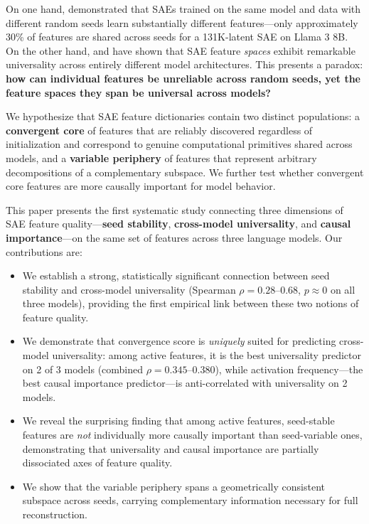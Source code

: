 \documentclass[final]{article}
\begin{document}
On one hand, \citet{paulo2025sparse} demonstrated that SAEs trained on the same model and data with different random seeds learn substantially different features---only approximately 30\% of features are shared across seeds for a 131K-latent SAE on Llama 3 8B. On the other hand, \citet{lan2024universal} and \citet{thasarathan2025universal} have shown that SAE feature \emph{spaces} exhibit remarkable universality across entirely different model architectures. This presents a paradox: \textbf{how can individual features be unreliable across random seeds, yet the feature spaces they span be universal across models?}

We hypothesize that SAE feature dictionaries contain two distinct populations: a \textbf{convergent core} of features that are reliably discovered regardless of initialization and correspond to genuine computational primitives shared across models, and a \textbf{variable periphery} of features that represent arbitrary decompositions of a complementary subspace. We further test whether convergent core features are more causally important for model behavior.

This paper presents the first systematic study connecting three dimensions of SAE feature quality---\textbf{seed stability}, \textbf{cross-model universality}, and \textbf{causal importance}---on the same set of features across three language models. Our contributions are:
\begin{itemize}
    \item We establish a strong, statistically significant connection between seed stability and cross-model universality (Spearman $\rho = 0.28$--$0.68$, $p \approx 0$ on all three models), providing the first empirical link between these two notions of feature quality.
    \item We demonstrate that convergence score is \emph{uniquely} suited for predicting cross-model universality: among active features, it is the best universality predictor on 2 of 3 models (combined $\rho = 0.345$--$0.380$), while activation frequency---the best causal importance predictor---is anti-correlated with universality on 2 models.
    \item We reveal the surprising finding that among active features, seed-stable features are \emph{not} individually more causally important than seed-variable ones, demonstrating that universality and causal importance are partially dissociated axes of feature quality.
    \item We show that the variable periphery spans a geometrically consistent subspace across seeds, carrying complementary information necessary for full reconstruction.
\end{itemize}
\end{document}
